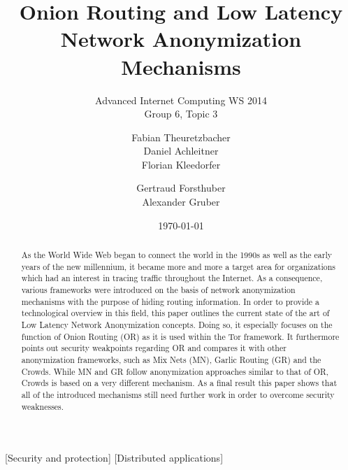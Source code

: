\documentclass{sig-alternate}
\begin{document}
\title{Onion Routing and Low Latency Network Anonymization Mechanisms}
\subtitle{Advanced Internet Computing WS 2014 \\ Group 6, Topic 3}


\author{
\alignauthor
Fabian Theuretzbacher\\
\alignauthor
Daniel Achleitner\\
\alignauthor Florian Kleedorfer\\
\and  %
\alignauthor Gertraud Forsthuber\\
\alignauthor Alexander Gruber\\
\and
\and
{}
}

\date{\today}
\maketitle

\begin{abstract}

As the World Wide Web began to connect the world in the 1990s as well as the early years of the new millennium, it became more and more a target area for organizations which had an interest in tracing traffic throughout the Internet. As a consequence, various frameworks were introduced on the basis of network anonymization mechanisms with the purpose of hiding routing information. In order to provide a technological overview in this field, this paper outlines the current state of the art of Low Latency Network Anonymization concepts. Doing so, it especially focuses on the function of Onion Routing (OR) as it is used within the Tor framework. It furthermore points out security weakpoints regarding OR and compares it with other anonymization frameworks, such as Mix Nets (MN), Garlic Routing (GR) and the Crowds. While MN and GR follow anonymization approaches similar to that of OR, Crowds is based on a very different mechanism. As a final result this paper shows that all of the introduced mechanisms still need further work in order to overcome security weaknesses.

\end{abstract}

[Security and protection]
[Distributed applications]
\end{document}

